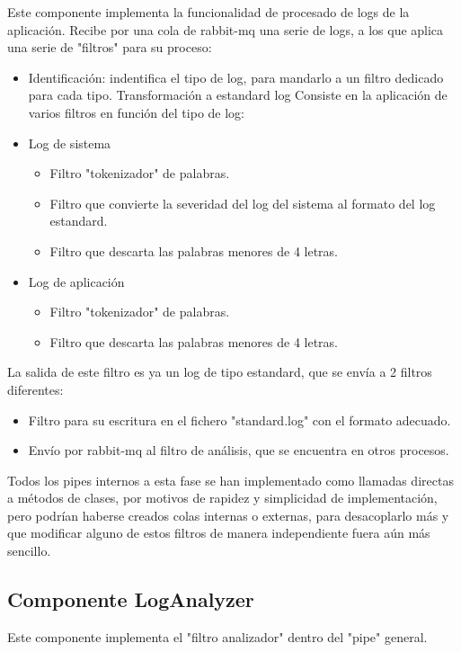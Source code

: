 \documentclass[11pt]{article}
\begin{document}
Este componente implementa la funcionalidad de procesado de logs de la aplicación. Recibe por una cola de rabbit-mq una serie de logs, a los que aplica una serie de "filtros" para su proceso:
\begin{itemize}
\item{Identificación}: indentifica el tipo de log, para mandarlo a un filtro dedicado para cada tipo.
Transformación a estandard log Consiste en la aplicación de varios filtros en función del tipo de log:
\item{Log de sistema}
\begin{itemize}
\item{Filtro "tokenizador" de palabras.}
\item{Filtro que convierte la severidad del log del sistema al formato del log estandard.}
\item{Filtro que descarta las palabras menores de 4 letras.}
\end{itemize}
\item{Log de aplicación}
\begin{itemize}
\item{Filtro "tokenizador" de palabras.}
\item{Filtro que descarta las palabras menores de 4 letras.}
\end{itemize}
\end{itemize}

La salida de este filtro es ya un log de tipo estandard, que se envía a 2 filtros diferentes:

\begin{itemize}
\item{Filtro para su escritura en el fichero "standard.log" con el formato adecuado.}
\item{Envío por rabbit-mq al filtro de análisis, que se encuentra en otros procesos.}
\end{itemize}

Todos los pipes internos a esta fase se han implementado como llamadas directas a métodos de clases, por motivos de rapidez y simplicidad de implementación, pero podrían haberse creados colas internas o externas, para desacoplarlo más y que modificar alguno de estos filtros de manera independiente fuera aún más sencillo.

\subsection{Componente LogAnalyzer}

Este componente implementa el "filtro analizador" dentro del "pipe" general.
\end{document}
